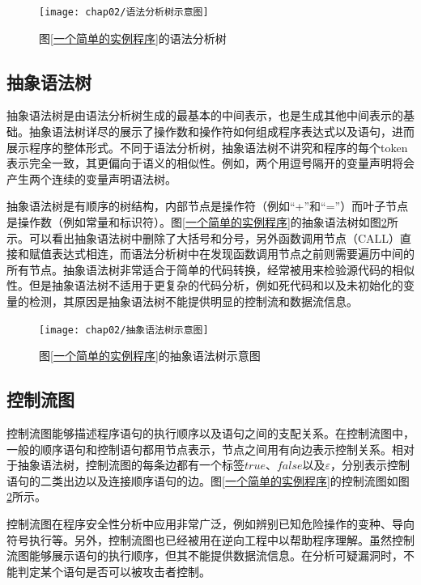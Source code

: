 \begin{figure}[htp]
\centering
\texttt{[image: chap02/语法分析树示意图]}
\caption{图\ref{一个简单的实例程序}的语法分析树}
\label{语法分析树示例}
\end{figure}

\subsection{抽象语法树}

抽象语法树是由语法分析树生成的最基本的中间表示，也是生成其他中间表示的基础。抽象语法树详尽的展示了操作数和操作符如何组成程序表达式以及语句，进而展示程序的整体形式。不同于语法分析树，抽象语法树不讲究和程序的每个token表示完全一致，其更偏向于语义的相似性。例如，两个用逗号隔开的变量声明将会产生两个连续的变量声明语法树。

抽象语法树是有顺序的树结构，内部节点是操作符（例如“+”和“=”）而叶子节点是操作数（例如常量和标识符）。图\ref{一个简单的实例程序}的抽象语法树如图\ref{抽象语法树示意图}所示。可以看出抽象语法树中删除了大括号和分号，另外函数调用节点{（CALL）}直接和赋值表达式相连，而语法分析树中在发现函数调用节点之前则需要遍历中间的所有节点。抽象语法树非常适合于简单的代码转换，经常被用来检验源代码的相似性。但是抽象语法树不适用于更复杂的代码分析，例如死代码和以及未初始化的变量的检测，其原因是抽象语法树不能提供明显的控制流和数据流信息。


\begin{figure}[htp]
\centering
\texttt{[image: chap02/抽象语法树示意图]}
\caption{图\ref{一个简单的实例程序}的抽象语法树示意图}
\label{抽象语法树示意图}
\end{figure}

\subsection{控制流图}

控制流图能够描述程序语句的执行顺序以及语句之间的支配关系。在控制流图中，一般的顺序语句和控制语句都用节点表示，节点之间用有向边表示控制关系。相对于抽象语法树，控制流图的每条边都有一个标签$true$、$false$以及$\varepsilon$，分别表示控制语句的二类出边以及连接顺序语句的边。图\ref{一个简单的实例程序}的控制流图如图\ref{抽象语法树示意图}所示。

控制流图在程序安全性分析中应用非常广泛，例如辨别已知危险操作的变种、导向符号执行等。另外，控制流图也已经被用在逆向工程中以帮助程序理解。虽然控制流图能够展示语句的执行顺序，但其不能提供数据流信息。在分析可疑漏洞时，不能判定某个语句是否可以被攻击者控制。

